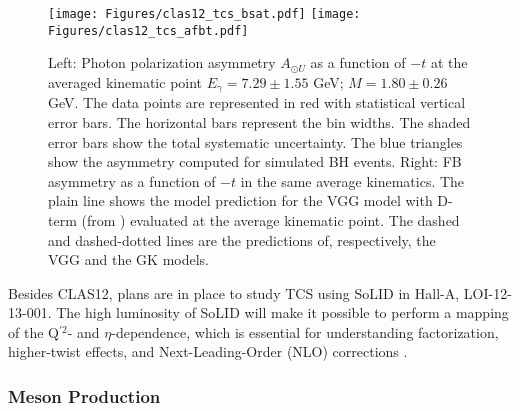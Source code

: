 \begin{figure}[ht]
\begin{center}
\texttt{[image: Figures/clas12\_tcs\_bsat.pdf]}
\texttt{[image: Figures/clas12\_tcs\_afbt.pdf]}
\caption{Left: Photon polarization asymmetry $A_{\odot U}$ as a function of $-t$ at the averaged kinematic point $E_\gamma = 7.29 \pm 1.55$ GeV; $M = 1.80 \pm 0.26$ GeV. The data points are represented in red with statistical vertical error bars. The horizontal bars represent the bin widths. The shaded error bars show the total systematic uncertainty. The blue triangles show the asymmetry computed for simulated BH events. Right: FB asymmetry as a function of $-t$ in the same average kinematics. The plain line shows the model prediction for the VGG model with D-term (from \cite{PASQUINI2014133}) evaluated at the average kinematic point. The dashed and dashed-dotted lines are the predictions of, respectively, the VGG \cite{vgg1,vgg2,gprv,gmv} and the GK \cite{Goloskokov2005, Goloskokov2008, Goloskokov2009} models.}
\label{fig:clas12tcs}
\end{center}
\end{figure}


Besides CLAS12, plans are in place to study TCS using SoLID in Hall-A, LOI-12-13-001. The high luminosity of SoLID will make it possible to perform a mapping of the Q$^{\prime 2}$- and $\eta$-dependence, which is essential for understanding factorization, higher-twist effects, and Next-Leading-Order (NLO) corrections \cite{Pire:2011st}. 

\subsubsection*{Meson Production}

